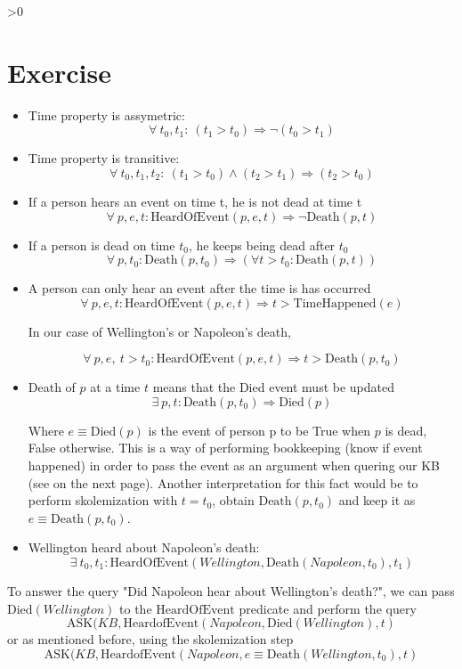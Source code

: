 \documentclass{article}
\newcounter{partCounter}
\newcounter{ExerciseCounter}
\newenvironment{Exercise}[1][-1]{
	\ifnum#1>0
	\setcounter{ExerciseCounter}{#1}
	\fi
	\section{Exercise \arabic{ExerciseCounter}}
	\setcounter{partCounter}{1}
}{
}
\begin{document}
\begin{Exercise}[2]
\begin{itemize}
	\item Time property is assymetric:
	$$ \forall ~t_0, t_1: ~(t_1 > t_0) \Rightarrow \neg (t_0 > t_1)$$
	\item Time property is transitive:
	$$ \forall ~t_0, t_1, t_2: ~ (t_1 > t_0) \wedge (t_2 > t_1) \Rightarrow (t_2 > t_0)  $$
	\item If a person hears an event on time t, he is not dead at time t
	$$ \forall ~p, e, t : \text{HeardOfEvent}(p,e,t) \Rightarrow \neg \text{Death}(p,t) $$
	\item If a person is dead on time $t_0$, he keeps being dead after $t_0$
	$$ \forall ~p, t_0: \text{Death}(p,t_0) \Rightarrow (\forall t>t_0 : \text{Death}(p,t))$$
	\item A person can only hear an event after the time is has occurred
	$$ \forall ~p,e,t : \text{HeardOfEvent}(p,e,t) \Rightarrow t > \text{TimeHappened}(e) $$
	
	In our case of Wellington's or Napoleon's death,
	
	$$ \forall ~p,e, ~t >t_0: \text{HeardOfEvent}(p,e,t) \Rightarrow t > \text{Death}(p,t_0) $$
	
	\item Death of $p$ at a time $t$ means that the Died event must be updated
	$$ \exists ~p,t: \text{Death}(p,t_0) \Rightarrow \text{Died}(p)$$
	
Where $e \equiv \text{Died}(p)$ is the event of person p to be True when $p$ is dead, False otherwise. This is a way of performing bookkeeping (know if event happened) in order to pass the event as an argument when quering our KB (see on the next page). Another interpretation for this fact would be to perform skolemization with $t=t_0$, obtain $\text{Death}(p,t_0)$ and keep it as $e \equiv \text{Death}(p,t_0)$.
	
	\item Wellington heard about Napoleon's death:
	$$ \exists ~t_0,t_1: \text{HeardOfEvent}(Wellington, \text{Death}(Napoleon,t_0),t_1)$$
	 
\end{itemize}

To answer the query "Did Napoleon hear about Wellington's death?", we can pass $\text{Died}(Wellington)$ to the $\text{HeardOfEvent}$ predicate and perform the query $$\text{ASK}(KB, \text{HeardofEvent}(Napoleon, \text{Died}(Wellington), t)$$ or as mentioned before, using the skolemization step $$\text{ASK}(KB, \text{HeardofEvent}(Napoleon, e \equiv \text{Death}(Wellington, t_0), t)$$
		
\end{Exercise}
\end{document}
